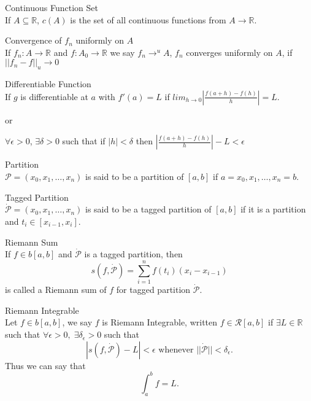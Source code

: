 \documentclass{article}
\newcommand{\reals}{{\mathbb R}}
\begin{document}
\begin{description}
\item Continuous Function Set \label{setofcontinuousfunctions}\hfill \\
If \(A\subseteq\mathbb{R}\), \(c(A)\) is the set of all continuous functions from \(A\to\mathbb{R}\).

\item Convergence of $f_n$ uniformly on $A$ \label{f_nuniformconvergence}\hfill \\
If $f_n:A\to \reals$ and $f:A_0\to \reals$ we say $f_n \displaystyle{\to^u} A$, $f_n$ converges uniformly on $A$, if $||f_n-f||_u\to 0$

\item Differentiable Function \label{differentiable}\hfill\\
If $g$ is differentiable at $a$ with $f'(a)=L$ if $\displaystyle{lim_{h\to 0}|\frac{f(a+h)-f(h)}{h}|=L}$.

or

$\forall \epsilon>0$, $\exists \delta>0$ such that if $|h|<\delta$ then $\displaystyle{|\frac{f(a+h)-f(h)}{h}|-L<\epsilon}$

\item Partition \label{partition}\hfill \\
\(\mathcal{P}=(x_0, x_1, \dots, x_n)\) is said to be a partition of \([a,b]\) if \(a=x_0, x_1, \dots, x_n=b\).

\item Tagged Partition \label{taggedpartition}\hfill \\
\(\dot{\mathcal{P}}=(x_0, x_1, \dots, x_n)\) is said to be a tagged partition of \([a,b]\) if it is a partition and \(t_i\in [x_{i-1}, x_i]\).

\item Riemann Sum \label{riemannsum}\hfill \\
If \(f\in b[a,b]\) and \(\dot{\mathcal{P}}\) is a tagged partition, then \[s(f,\dot{\mathcal{P}}) = \sum_{i=1}^n f(t_i)(x_i-x_{i-1})\] is called a Riemann sum of \(f\) for tagged partition \(\dot{\mathcal{P}}\).

\item Riemann Integrable \label{riemannintegrable}\hfill \\
Let \(f\in b[a,b]\), we say \(f\) is Riemann Integrable, written \(f\in \mathcal{R}[a,b]\) if \(\exists L\in\mathbb{R}\) such that \(\forall \epsilon>0,\;\exists\delta_\epsilon>0\) such that 
\[|s(f, \dot{\mathcal{P}}) - L| < \epsilon \text{ whenever }||\dot{\mathcal{P}}|| < \delta_\epsilon.\]
Thus we can say that 
\[\int_a^b f = L.\]


\end{description}
\end{document}
